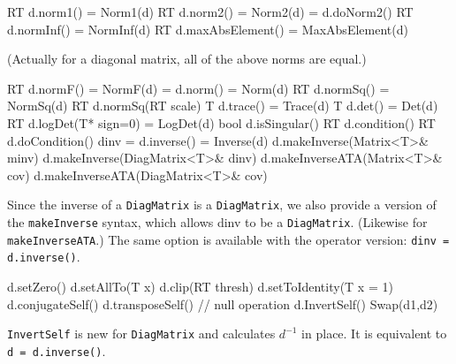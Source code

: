 \documentclass[twoside,letterpaper,11pt]{article}
\renewcommand{\tt}[1]{{\lstinline {#1}}}
\begin{document}
\begin{tmvcode}
RT d.norm1() = Norm1(d)
RT d.norm2() = Norm2(d) = d.doNorm2()
RT d.normInf() = NormInf(d)
RT d.maxAbsElement() = MaxAbsElement(d)
\end{tmvcode}
(Actually for a diagonal matrix, all of the above norms are equal.)
\begin{tmvcode}
RT d.normF() = NormF(d) = d.norm() = Norm(d)
RT d.normSq() = NormSq(d)
RT d.normSq(RT scale)
T d.trace() = Trace(d)
T d.det() = Det(d)
RT d.logDet(T* sign=0) = LogDet(d)
bool d.isSingular()
RT d.condition()
RT d.doCondition()
dinv = d.inverse() = Inverse(d)
d.makeInverse(Matrix<T>& minv)
d.makeInverse(DiagMatrix<T>& dinv)
d.makeInverseATA(Matrix<T>& cov)
d.makeInverseATA(DiagMatrix<T>& cov)
\end{tmvcode}
Since the inverse of a \tt{DiagMatrix} is a \tt{DiagMatrix},
we also provide a version of the \tt{makeInverse} syntax, which allows dinv
to be a \tt{DiagMatrix}.  (Likewise for \tt{makeInverseATA}.)  The same option is 
available with the operator version: \tt{dinv = d.inverse()}.

\begin{tmvcode}
d.setZero()
d.setAllTo(T x)
d.clip(RT thresh)
d.setToIdentity(T x = 1)
d.conjugateSelf()
d.transposeSelf() // null operation
d.InvertSelf()
Swap(d1,d2)
\end{tmvcode}
\tt{InvertSelf} is new for \tt{DiagMatrix} and calculates $d^{-1}$ in place.  
It is equivalent to \tt{d = d.inverse()}.
\end{document}
